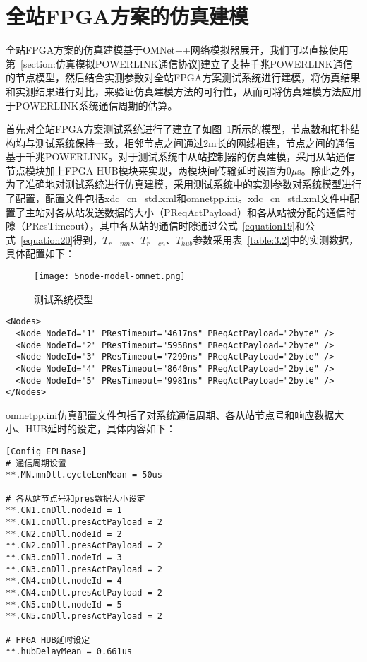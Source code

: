 \section{全站FPGA方案的仿真建模}
全站FPGA方案的仿真建模基于OMNet++网络模拟器展开，我们可以直接使用第~\ref{section:仿真模拟POWERLINK通信协议}建立了支持千兆POWERLINK通信的节点模型，然后结合实测参数对全站FPGA方案测试系统进行建模，将仿真结果和实测结果进行对比，来验证仿真建模方法的可行性，从而可将仿真建模方法应用于POWERLINK系统通信周期的估算。

首先对全站FPGA方案测试系统进行了建立了如图~\ref{fig:5node-model-omnet}所示的模型，节点数和拓扑结构均与测试系统保持一致，相邻节点之间通过2m长的网线相连，节点之间的通信基于千兆POWERLINK。对于测试系统中从站控制器的仿真建模，采用从站通信节点模块加上FPGA HUB模块来实现，两模块间传输延时设置为0$\mu$s。除此之外，为了准确地对测试系统进行仿真建模，采用测试系统中的实测参数对系统模型进行了配置，配置文件包括xdc\_cn\_std.xml和omnetpp.ini。xdc\_cn\_std.xml文件中配置了主站对各从站发送数据的大小（PReqActPayload）和各从站被分配的通信时隙（PResTimeout），其中各从站的通信时隙通过公式~\ref{equation19}和公式~\ref{equation20}得到，$T_{r-mn}$、$T_{r-cn}$、$T_{hub}$参数采用表~\ref{table:3.2}中的实测数据，具体配置如下：

\begin{figure}[!htb]
	\centering
	\texttt{[image: 5node-model-omnet.png]}
	\caption{测试系统模型}
	\label{fig:5node-model-omnet}
\end{figure}

\begin{lstlisting}
<Nodes>
  <Node NodeId="1" PResTimeout="4617ns" PReqActPayload="2byte" />
  <Node NodeId="2" PResTimeout="5958ns" PReqActPayload="2byte" />
  <Node NodeId="3" PResTimeout="7299ns" PReqActPayload="2byte" />
  <Node NodeId="4" PResTimeout="8640ns" PReqActPayload="2byte" />
  <Node NodeId="5" PResTimeout="9981ns" PReqActPayload="2byte" />
</Nodes>
\end{lstlisting}

omnetpp.ini仿真配置文件包括了对系统通信周期、各从站节点号和响应数据大小、HUB延时的设定，具体内容如下：

\begin{lstlisting}
[Config EPLBase]
# 通信周期设置
**.MN.mnDll.cycleLenMean = 50us

# 各从站节点号和pres数据大小设定
**.CN1.cnDll.nodeId = 1
**.CN1.cnDll.presActPayload = 2
**.CN2.cnDll.nodeId = 2
**.CN2.cnDll.presActPayload = 2
**.CN3.cnDll.nodeId = 3
**.CN3.cnDll.presActPayload = 2
**.CN4.cnDll.nodeId = 4
**.CN4.cnDll.presActPayload = 2
**.CN5.cnDll.nodeId = 5
**.CN5.cnDll.presActPayload = 2

# FPGA HUB延时设定
**.hubDelayMean = 0.661us
\end{lstlisting}

